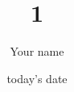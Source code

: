 \documentclass[12pt]{report}
\title{1}
\author{ Your name}
\date{today's date}
\makeatletter
\let\thetitle\@title
\makeatother
\begin{document}


%	
%            
%           
%	
%    
%    
%    
%    
%	


\tableofcontents
\pagebreak

\renewcommand{\thesection}{\arabic{section}}
 



 
\end{document}
